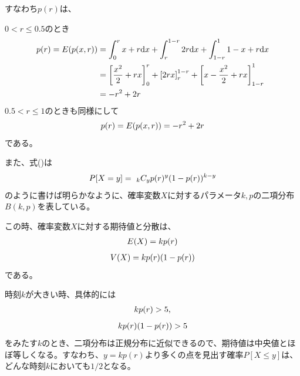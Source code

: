 \documentclass[letterpaper,10pt,english]{sphinxmanual}
\begin{document}
すなわち\(p(r)\)は、

\(0<r\le0.5\)のとき
\begin{gather}
\begin{split}\begin{align}p(r) = E(p(x, r)) &= \int^{r}_{0}x+r\mathrm{d}x + \int^{1-r}_{r}2r \mathrm{d}x + \int^{1}_{1-r} 1-x+r \mathrm{d}x\\
&= \left[\frac{x^{2}}{2} + rx \right]^{r}_{0} + \left[ 2rx\right]^{1-r}_{r}+ \left[ x-\frac{x^{2}}{2} + rx\right]^{1}_{1-r}\\
&= -r^{2} + 2r \end{align}\end{split}\notag
\end{gather}
\(0.5<r\le1\)のときも同様にして
\begin{gather}
\begin{split}p(r) = E(p(x,r)) = -r^{2} + 2r\end{split}\notag
\end{gather}
である。

また、式()は
\begin{gather}
\begin{split}P[X=y] =\ _{k}C_{y}p(r)^{y}(1-p(r))^{k-y}\end{split}\notag
\end{gather}
のように書けば明らかなように、確率変数\(X\)に対するパラメータ\(k,p\)の二項分布\(B(k,p)\)を表している。

この時、確率変数\(X\)に対する期待値と分散は、
\begin{gather}
\begin{split}E(X) = kp(r)\end{split}\notag
\end{gather}\begin{gather}
\begin{split}V(X) = kp(r)(1-p(r))\end{split}\notag
\end{gather}
である。

時刻\(k\)が大きい時、具体的には
\begin{gather}
\begin{split}kp(r) > 5,\end{split}\notag
\end{gather}\begin{gather}
\begin{split}kp(r)(1-p(r)) > 5\end{split}\notag
\end{gather}
をみたす\(k\)のとき、二項分布は正規分布に近似できるので、期待値は中央値とほぼ等しくなる。すなわち、\(y=kp(r)\)より多くの点を見出す確率\(P[X\le y]\)は、どんな時刻\(k\)においても\(1/2\)となる。
\end{document}
